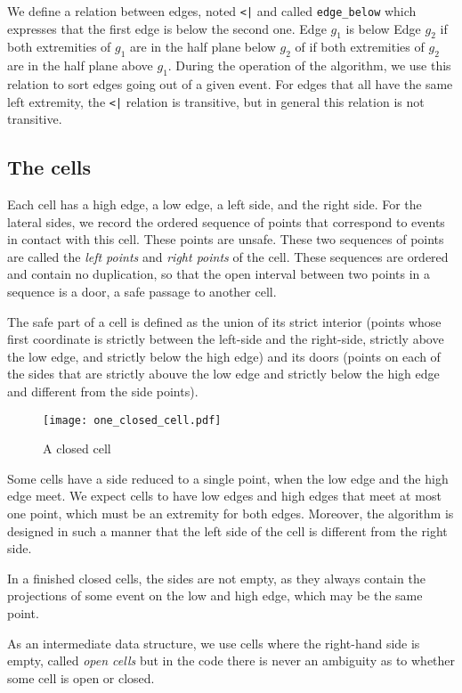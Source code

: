 \documentclass[a4paper, USenglish, cleveref, autoref, thm-restate]{lipics-v2021}
\begin{document}
We define a relation between edges, noted {\tt <|} and called
{\tt edge\_below} which expresses
that the first edge is below the second one.  Edge \(g_1\) is below Edge
\(g_2\) if both extremities of \(g_1\) are in the half plane below
\(g_2\) of if both extremities of \(g_2\) are in the half plane above
\(g_1\).  During the operation of the algorithm, we use this relation
to sort edges going out of a given event.  For edges that all have the
same left extremity, the {\tt <|} relation is transitive, but in
general this relation is not transitive.
\subsection{The cells}
Each cell has a high edge, a low edge, a left side, and the right side.  For
the lateral sides, we record the ordered sequence of points that
correspond  to events in contact with this cell.  These points are
unsafe.  These two sequences of points are called the {\em left
  points} and {\em right points} of the cell.  These sequences are
ordered and contain no duplication, so that the open interval between two
points in a sequence is a door, a safe passage to another cell.

The safe part of a cell is defined as the union of its strict interior
(points whose first coordinate is strictly between the left-side and
the right-side, strictly above the low edge, and strictly below the
high edge) and its doors (points on each of the sides that are
strictly abouve the low edge and strictly below the high edge and
different from the side points).

\begin{figure}
\texttt{[image: one\_closed\_cell.pdf]}
\caption{A closed cell}
\end{figure}

Some cells have a side reduced to a single point, when the low edge
and the high edge meet.  We expect cells to have low edges and high
edges that meet at most one point, which must be an extremity for both
edges.  Moreover, the algorithm is designed in such a manner that the
left side of the cell is different from the right side.

In a finished closed cells, the sides are not empty, as they always
contain the projections of some event on the low and high edge, which
may be the same point.

As an intermediate data structure, we use cells where the
right-hand side is empty, called {\em open cells}  but in the code
there is never an ambiguity as to whether some cell is open or closed.
\end{document}
